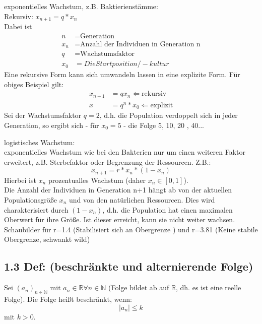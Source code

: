 \documentclass[12pt]{article}
\begin{document}
\begin{compactenum}[\bfseries a)]
\item exponentielles Wachstum, z.B. Baktierienstämme:\\
Rekursiv: $x_{n+1} = q*x_n$ \\
Dabei ist \begin{align*}
n&= \text{Generation}\\
x_n &= \text{Anzahl der Individuen in Generation n}\\
q&= \text{Wachstumsfaktor}\\
x_0&= Die Startposition/-kultur
\end{align*}
Eine rekursive Form kann sich umwandeln lassen in eine explizite Form. Für obiges Beispiel gilt: 
\begin{align*}
x_{n+1} &= qx_n \Leftarrow \text{rekursiv}\\
x &= q^n * x_0 \Leftarrow \text{explizit}
\end{align*}
Sei der Wachstumsfaktor $q=2$, d.h. die Population verdoppelt sich in jeder Generation, so ergibt sich - für $x_0 = 5$ - die Folge 5, 10, 20 , 40...\\

\item logistisches Wachstum: \\
exponentielles Wachstum wie bei den Bakterien nur um einen weiteren Faktor erweitert, z.B. Sterbefaktor oder Begrenzung der Ressourcen. Z.B.:
$$ x_{n+1} = r* x_n *(1-x_n) $$ 
Hierbei ist $x_n$ prozentualles Wachstum (daher $x_n \in [0,1]$).\\
Die Anzahl der Individuen in Generation n+1 hängt ab von der aktuellen Populationsgröße $x_n$ und von den natürlichen Ressourcen. Dies wird charakterisiert durch $(1-x_n)$, d.h. die Population hat einen maximalen Oberwert für ihre Größe. Ist dieser erreicht, kann sie nicht weiter wachsen. \\
Schaubilder für r=1.4 (Stabilisiert sich an Obergrenze ) und r=3.81 (Keine stabile Obergrenze, schwankt wild)\\
\end{compactenum}

\subsection*{1.3 Def: (beschränkte und alternierende Folge)}
Sei $(a_n)_{n\in\mathbb{N}}$ mit $a_n \in \mathbb{R} \forall n\in \mathbb{N}$ (Folge bildet ab auf $\mathbb{R}$, dh. es ist eine reelle Folge). Die Folge heißt beschränkt, wenn:
$$ |a_n| \leq k$$
mit $k > 0$.\\
\end{document}
